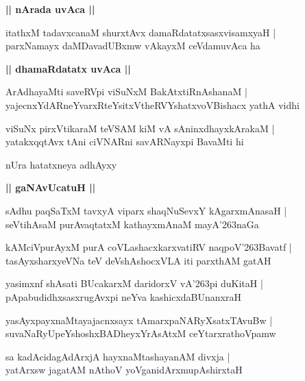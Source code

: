 \documentclass[twoside,12pt,openright]{book}
\def\S{\char'263}
\newcounter{shloka}[chapter]
\def\uvaca#1{\centerline{{\large\textbf{#1}}}}
\begin{document}
\uvaca{|| nArada uvAca ||}

\begin{shloka}%
itathxM tadavxcanaM shurxtAvx damaRdatatxsasxvisamxyaH |\\
parxNamayx daMDavadUBxmw vAkayxM ceVdamuvAca ha 
\end{shloka}

\uvaca{|| dhamaRdatatx uvAca ||}

\begin{shloka}%
ArAdhayaMti saveRVpi viSuNxM BakAtxtiRnAshanaM |\\
yajecnxYdARneYvarxRteYsitxVtheRVYshatxvoVBishacx yathA vidhi 
\end{shloka}

\begin{shloka}%
viSuNx pirxVtikaraM teVSAM kiM vA sAninxdhayxkArakaM |\\
yatakxqqtAvx tAni ciVNARni savARNayxpi BavaMti hi 
\end{shloka}

\begin{center}
nUra hatatxneya adhAyxy
\end{center}

\uvaca{|| gaNAvUcatuH ||}

\begin{shloka}%
sAdhu paqSaTxM tavxyA viparx shaqNuSevxY kAgarxmAnasaH |\\
seVtihAsaM purAvaqtatxM kathayxmAnaM mayA\S naGa
\end{shloka}

\begin{shloka}%
kAMciVpurAyxM purA coVLashacxkarxvatiRV naqpoV\S Bavatf |\\
tasAyxsharxyeVNa teV deVshAshocxVLA iti parxthAM gatAH 
\end{shloka}

\begin{shloka}%
yasimxnf shAsati BUcakarxM daridorxV vA\S pi duKitaH |\\
pApabudidhxsasxrugAvxpi neYva kashicxdaBUnanxraH 
\end{shloka}

\begin{shloka}%
yasAyxpayxnaMtayajacnxsayx tAmarxpaNARyXsatxTAvuBw |\\
suvaNaRyUpeYshoshxBADheyxYrAsAtxM ceYtarxrathoVpamw
\end{shloka}

\begin{shloka}%
sa kadAcidagAdArxjA hayxnaMtashayanAM divxja |\\
yatArxsw jagatAM nAthoV yoVganidArxmupAshirxtaH 
\end{shloka}
\end{document}
